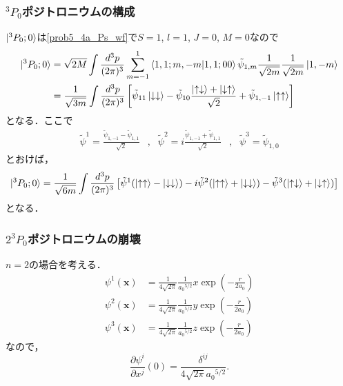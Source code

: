 \subsubsection{$^3P_0$ポジトロニウムの構成}
$\ket{^3P_0;0}$は\eqref{prob5_4a_Ps_wf}で$S=1$, $l=1$, $J=0$, $M=0$なので
\begin{align*}
  \ket{^3P_0;0} &= \sqrt{2M} \int \frac{d^3p}{(2\pi)^3} \sum_{m=-1}^1
  \braket{1,1; m,-m | 1,1; 00} \tilde{\psi}_{1,m} \frac{1}{\sqrt{2m}}\frac{1}{\sqrt{2m}} \ket{1, -m} \\
  &= \frac{1}{\sqrt{3m}} \int \frac{d^3p}{(2\pi)^3} \left[ \tilde{\psi}_{11} \ket{\downarrow\downarrow}
  - \tilde{\psi}_{10} \frac{\ket{\uparrow\downarrow} + \ket{\downarrow\uparrow}}{\sqrt{2}} + \tilde{\psi}_{1,-1} \ket{\uparrow\uparrow} \right]
\end{align*}
となる．ここで
\begin{align}
  \tilde{\psi}^1 = \frac{\tilde{\psi}_{1,-1} - \tilde{\psi}_{1,1}}{\sqrt{2}} & , &
  \tilde{\psi}^2 = i\frac{\tilde{\psi}_{1,-1} + \tilde{\psi}_{1,1}}{\sqrt{2}} & , &
  \tilde{\psi}^3 = \tilde{\psi}_{1,0}
  \label{prob5_4b_wave_func_conv}
\end{align}
とおけば，
\begin{align*}
  \ket{^3P_0;0} &= \frac{1}{\sqrt{6m}} \int \frac{d^3p}{(2\pi)^3}
  \left[ \tilde{\psi}^1  (\ket{\uparrow\uparrow} - \ket{\downarrow\downarrow})
  - i \tilde{\psi}^2  (\ket{\uparrow\uparrow} + \ket{\downarrow\downarrow})
  - \tilde{\psi}^3 (\ket{\uparrow\downarrow} + \ket{\downarrow\uparrow}) \right]
\end{align*}
となる．

\subsubsection{$2^3P_0$ポジトロニウムの崩壊}
$n=2$の場合を考える．
\begin{align*}
  \psi^1(\boldsymbol{x}) &= \frac{1}{4\sqrt{2\pi}} \frac{1}{a_0{}^{5/2}} x \exp\left( -\frac{r}{2a_0} \right) \\
  \psi^2(\boldsymbol{x}) &= \frac{1}{4\sqrt{2\pi}} \frac{1}{a_0{}^{5/2}} y \exp\left( -\frac{r}{2a_0} \right) \\
  \psi^3(\boldsymbol{x}) &= \frac{1}{4\sqrt{2\pi}} \frac{1}{a_0{}^{5/2}} z \exp\left( -\frac{r}{2a_0} \right)
\end{align*}
なので，
\[ \frac{\partial \psi^i}{\partial x^j}(0) = \frac{\delta^{ij}}{4\sqrt{2\pi} a_0{}^{5/2}} . \]

